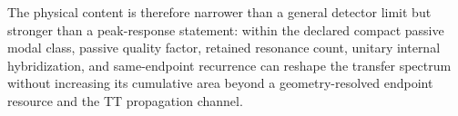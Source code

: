 The physical content is therefore narrower than a general detector limit but stronger than a peak-response statement: within the declared compact passive modal class, passive quality factor, retained resonance count, unitary internal hybridization, and same-endpoint recurrence can reshape the transfer spectrum without increasing its cumulative area beyond a geometry-resolved endpoint resource and the TT propagation channel.
